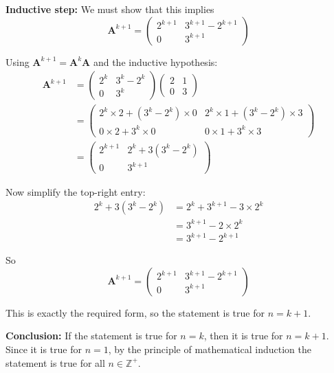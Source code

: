 \documentclass[leqno]{article}
\begin{document}
\begin{enumerate}[
  label=\textbf{\arabic*.},
  leftmargin=*,
  topsep=0pt,
  partopsep=0pt,
  parsep=0pt
]
\begin{djsSolution}
\textbf{Inductive step:} We must show that this implies
\[
\mathbf{A}^{k+1}=\begin{pmatrix}2^{k+1}&3^{k+1}-2^{k+1}\\0&3^{k+1}\end{pmatrix}
\]

Using $\mathbf{A}^{k+1}=\mathbf{A}^k\mathbf{A}$ and the inductive hypothesis:
\begin{align*}
\mathbf{A}^{k+1}
&=
\begin{pmatrix}2^k&3^k-2^k\\0&3^k\end{pmatrix}
\begin{pmatrix}2&1\\0&3\end{pmatrix} \\
&=
\begin{pmatrix}
2^k\times2+(3^k-2^k)\times0 & 2^k\times1+(3^k-2^k)\times3 \\
0\times2+3^k\times0 & 0\times1+3^k\times3
\end{pmatrix} \\
&=
\begin{pmatrix}
2^{k+1} & 2^k+3(3^k-2^k) \\
0 & 3^{k+1}
\end{pmatrix}
\end{align*}

Now simplify the top-right entry:
\begin{align*}
2^k+3(3^k-2^k)
&=2^k+3^{k+1}-3\times2^k \\
&=3^{k+1}-2\times2^k \\
&=3^{k+1}-2^{k+1}
\end{align*}

So
\[
\mathbf{A}^{k+1}=
\begin{pmatrix}
2^{k+1} & 3^{k+1}-2^{k+1} \\
0 & 3^{k+1}
\end{pmatrix}
\]

This is exactly the required form, so the statement is true for $n=k+1$.

\textbf{Conclusion:} If the statement is true for $n=k$, then it is true for $n=k+1$. Since it is true for $n=1$, by the principle of mathematical induction the statement is true for all $n\in\mathbb{Z}^+$.
\end{djsSolution}


\newpage

\questionitem


\end{enumerate}
\end{document}
